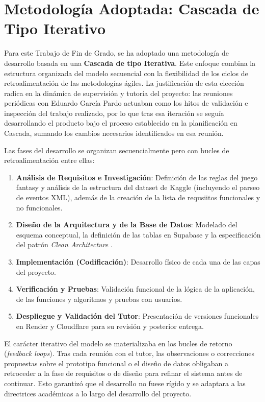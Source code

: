 \section{Metodología Adoptada: Cascada de Tipo Iterativo}
\label{sec:cascada_iterativa}

Para este Trabajo de Fin de Grado, se ha adoptado una metodología de desarrollo basada en una \textbf{Cascada de tipo Iterativa}. Este enfoque combina la estructura organizada del modelo secuencial con la flexibilidad de los ciclos de retroalimentación de las metodologías ágiles. La justificación de esta elección radica en la dinámica de supervisión y tutoría del proyecto: las reuniones periódicas con Eduardo García Pardo actuaban como los hitos de validación e inspección del trabajo realizado, por lo que tras esa iteración se seguía desarrollando el producto bajo el proceso establecido en la planificación en Cascada, sumando los cambios necesarios identificados en esa reunión.

Las fases del desarrollo se organizan secuencialmente pero con bucles de retroalimentación entre ellas:

\begin{enumerate}
    \item \textbf{Análisis de Requisitos e Investigación}: Definición de las reglas del juego fantasy y análisis de la estructura del dataset de Kaggle (incluyendo el parseo de eventos XML), además de la creación de la lista de requsiitos funcionales y no funcionales.
    \item \textbf{Diseño de la Arquitectura y de la Base de Datos}: Modelado del esquema conceptual, la definición de las tablas en Supabase y la especificación del patrón \textit{Clean Architecture} \cite{martin_clean_arch}.
    \item \textbf{Implementación (Codificación)}: Desarrollo físico de cada una de las capas del proyecto.
    \item \textbf{Verificación y Pruebas}: Validación funcional de la lógica de la aplicación, de las funciones y algoritmos y pruebas con usuarios.
    \item \textbf{Despliegue y Validación del Tutor}: Presentación de versiones funcionales en Render y Cloudflare para su revisión y posterior entrega.
\end{enumerate}

El carácter iterativo del modelo se materializaba en los bucles de retorno (\textit{feedback loops}). Tras cada reunión con el tutor, las observaciones o correcciones propuestas sobre el prototipo funcional o el diseño de datos obligaban a retroceder a la fase de requisitos o de diseño para refinar el sistema antes de continuar. Esto garantizó que el desarrollo no fuese rígido y se adaptara a las directrices académicas a lo largo del desarrollo del proyecto.

